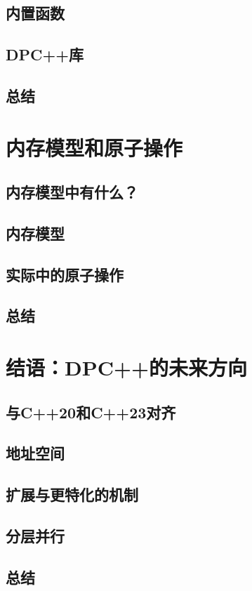 \documentclass[11pt,a4paper,UTF8]{ctexart}
\begin{document}
		\subsection{内置函数}
		\subsection{DPC++库}
		\subsection{总结}
	\section{内存模型和原子操作}
		\subsection{内存模型中有什么？}
		\subsection{内存模型}
		\subsection{实际中的原子操作}
		\subsection{总结}
	\section{结语：DPC++的未来方向}
		\subsection{与C++20和C++23对齐}
		\subsection{地址空间}
		\subsection{扩展与更特化的机制}
		\subsection{分层并行}
		\subsection{总结}
\end{document}
